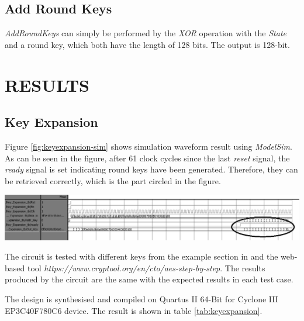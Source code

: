 \documentclass[a4paper, 10pt]{article}
\newenvironment{Figure}
    {\par\medskip\noindent\minipage{\linewidth}}
    {\endminipage\par\medskip}
\begin{document}
\begin{multicols}{2}
            \subsection{Add Round Keys}

            \textit{AddRoundKeys} can simply be performed by the \textit{XOR} operation with the \textit{State} and a round key, which both have the length of 128 bits. The output is 128-bit.

        \section{RESULTS}

        \subsection{Key Expansion}

        Figure \ref{fig:keyexpansion-sim} shows simulation waveform result using \textit{ModelSim}. As can be seen in the figure, after 61 clock cycles since the last \textit{reset} signal, the \textit{ready} signal is set indicating round keys have been generated. Therefore, they can be retrieved correctly, which is the part circled in the figure.

            \begin{Figure}
                \centering
                \includegraphics[width=\linewidth]{KeyExpansion-GetRoundKeysStage-edited.png}
                \label{fig:keyexpansion-sim}
            \end{Figure}

        The circuit is tested with different keys from the example section in \cite{AES} and the web-based tool \textit{https://www.cryptool.org/en/cto/aes-step-by-step}. The results produced by the circuit are the same with the expected results in each test case.

	The design is synthesised and compiled on Quartus II 64-Bit for Cyclone III EP3C40F780C6 device. The result is shown in table \ref{tab:keyexpansion}.


\end{multicols}
\end{document}
